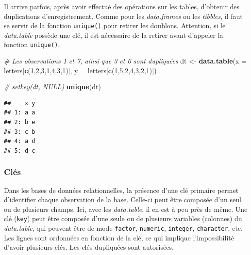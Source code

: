 \documentclass[
  11pt,
]{book}
\newenvironment{Shaded}{\begin{snugshade}}{\end{snugshade}}
\newcommand{\CommentTok}[1]{\textcolor[rgb]{0.56,0.35,0.01}{\textit{#1}}}
\newcommand{\DataTypeTok}[1]{\textcolor[rgb]{0.13,0.29,0.53}{#1}}
\newcommand{\DecValTok}[1]{\textcolor[rgb]{0.00,0.00,0.81}{#1}}
\newcommand{\KeywordTok}[1]{\textcolor[rgb]{0.13,0.29,0.53}{\textbf{#1}}}
\newcommand{\NormalTok}[1]{#1}
\newcommand{\StringTok}[1]{\textcolor[rgb]{0.31,0.60,0.02}{#1}}
\numberwithin{equation}{section}
\numberwithin{countremarque}{section}
\begin{document}
Il arrive parfois, après avoir effectué des opérations sur les tables, d'obtenir des duplications d'enregistrement. Comme pour les \emph{data.frames} ou les \emph{tibbles}, il faut se servir de la fonction \texttt{unique()} pour retirer les doublons. Attention, si le \emph{data.table} possède une clé, il est nécessaire de la retirer avant d'appeler la fonction \texttt{unique()}.

\begin{Shaded}
\begin{Highlighting}[]
\CommentTok{\# Les observations 1 et 7, ainsi que 3 et 6 sont dupliquées}
\NormalTok{dt \textless{}{-}}\StringTok{ }\KeywordTok{data.table}\NormalTok{(}\DataTypeTok{x =}\NormalTok{ letters[}\KeywordTok{c}\NormalTok{(}\DecValTok{1}\NormalTok{,}\DecValTok{2}\NormalTok{,}\DecValTok{3}\NormalTok{,}\DecValTok{1}\NormalTok{,}\DecValTok{4}\NormalTok{,}\DecValTok{3}\NormalTok{,}\DecValTok{1}\NormalTok{)],}
                 \DataTypeTok{y =}\NormalTok{ letters[}\KeywordTok{c}\NormalTok{(}\DecValTok{1}\NormalTok{,}\DecValTok{5}\NormalTok{,}\DecValTok{2}\NormalTok{,}\DecValTok{4}\NormalTok{,}\DecValTok{3}\NormalTok{,}\DecValTok{2}\NormalTok{,}\DecValTok{1}\NormalTok{)])}

\CommentTok{\# setkey(dt, NULL)}
\KeywordTok{unique}\NormalTok{(dt)}
\end{Highlighting}
\end{Shaded}

\begin{lstlisting}
##    x y
## 1: a a
## 2: b e
## 3: c b
## 4: a d
## 5: d c
\end{lstlisting}

\hypertarget{manip-datatable-cles}{%
\subsubsection{Clés}\label{manip-datatable-cles}}

Dans les bases de données relationnelles, la présence d'une clé primaire permet d'identifier chaque observation de la base. Celle-ci peut être composée d'un seul ou de plusieurs champs. Ici, avec les \emph{data.table}, il en est à peu près de même. Une clé (\texttt{key}) peut être composée d'une seule ou de plusieurs variables (colonnes) du \emph{data.table}, qui peuvent être de mode \texttt{factor}, \texttt{numeric}, \texttt{integer}, \texttt{character}, etc. Les lignes sont ordonnées en fonction de la clé, ce qui implique l'impossibilité d'avoir plusieurs clés. Les clés dupliquées sont autorisées.
\end{document}
